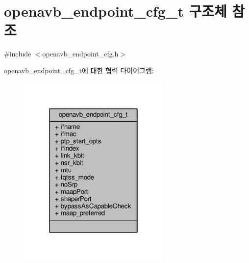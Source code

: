 \hypertarget{structopenavb__endpoint__cfg__t}{}\section{openavb\+\_\+endpoint\+\_\+cfg\+\_\+t 구조체 참조}
\label{structopenavb__endpoint__cfg__t}


{\ttfamily \#include $<$openavb\+\_\+endpoint\+\_\+cfg.\+h$>$}



openavb\+\_\+endpoint\+\_\+cfg\+\_\+t에 대한 협력 다이어그램\+:
\nopagebreak
\begin{figure}[H]
\begin{center}
\leavevmode
\includegraphics[width=214pt]{structopenavb__endpoint__cfg__t__coll__graph}
\end{center}
\end{figure}
